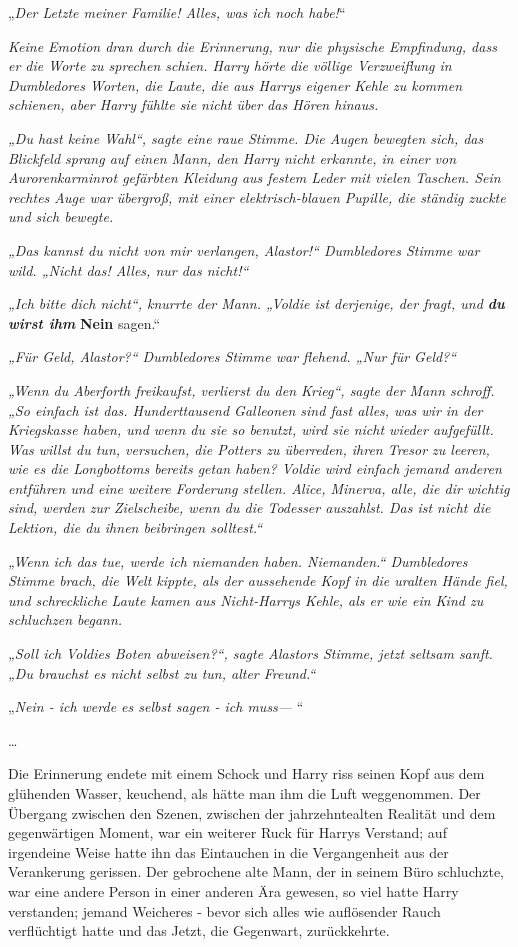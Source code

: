 {„\emph{Der Letzte meiner Familie! Alles, was ich noch habe!}“

\emph{Keine Emotion dran durch die Erinnerung, nur die physische Empfindung, dass er die Worte zu sprechen schien. Harry hörte die völlige Verzweiflung in Dumbledores Worten, die Laute, die aus Harrys eigener Kehle zu kommen schienen, aber Harry fühlte sie nicht über das Hören hinaus.}

\emph{„Du hast keine Wahl“, sagte eine raue Stimme. Die Augen bewegten sich, das Blickfeld sprang auf einen Mann, den Harry nicht erkannte, in einer von Aurorenkarminrot gefärbten Kleidung aus festem Leder mit vielen Taschen. Sein rechtes Auge war übergroß, mit einer elektrisch-blauen Pupille, die ständig zuckte und sich bewegte.}

\emph{„Das kannst du nicht von mir verlangen, Alastor!“ Dumbledores Stimme war wild. „Nicht das! Alles, nur das nicht!“}

\emph{„Ich bitte dich nicht“, knurrte der Mann. „Voldie ist derjenige, der fragt, und \textbf{du wirst ihm}} \textbf{Nein} sagen.“

\emph{„Für Geld, Alastor?“ Dumbledores Stimme war flehend. „Nur für Geld?“}

\emph{„Wenn du Aberforth freikaufst, verlierst du den Krieg“, sagte der Mann schroff. „So einfach ist das. Hunderttausend Galleonen sind fast alles, was wir in der Kriegskasse haben, und wenn du sie so benutzt, wird sie nicht wieder aufgefüllt. Was willst du tun, versuchen, die Potters zu überreden, ihren Tresor zu leeren, wie es die Longbottoms bereits getan haben? Voldie wird einfach jemand anderen entführen und eine weitere Forderung stellen. Alice, Minerva, alle, die dir wichtig sind, werden zur Zielscheibe, wenn du die Todesser auszahlst. Das ist nicht die Lektion, die du ihnen beibringen solltest.“}

\emph{„Wenn ich das tue, werde ich niemanden haben. Niemanden.“ Dumbledores Stimme brach, die Welt kippte, als der aussehende Kopf in die uralten Hände fiel, und schreckliche Laute kamen aus Nicht-Harrys Kehle, als er wie ein Kind zu schluchzen begann.}

\emph{„Soll ich Voldies Boten abweisen?“, sagte Alastors Stimme, jetzt seltsam sanft. „Du brauchst es nicht selbst zu tun, alter Freund.“}

„\emph{Nein - ich werde es selbst sagen - ich muss—} “

…

Die Erinnerung endete mit einem Schock und Harry riss seinen Kopf aus dem glühenden Wasser, keuchend, als hätte man ihm die Luft weggenommen. Der Übergang zwischen den Szenen, zwischen der jahrzehntealten Realität und dem gegenwärtigen Moment, war ein weiterer Ruck für Harrys Verstand; auf irgendeine Weise hatte ihn das Eintauchen in die Vergangenheit aus der Verankerung gerissen. Der gebrochene alte Mann, der in seinem Büro schluchzte, war eine andere Person in einer anderen Ära gewesen, so viel hatte Harry verstanden; jemand Weicheres - bevor sich alles wie auflösender Rauch verflüchtigt hatte und das Jetzt, die Gegenwart, zurückkehrte.

}
